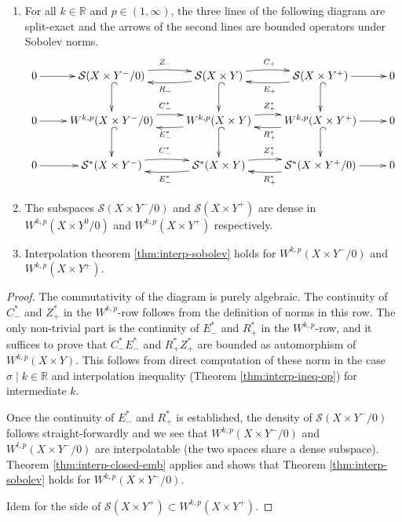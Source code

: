 \begin{theorem}
\label{thm:sobolev-def-ses}
\begin{enumerate}
\item For all \(k\in \mathbb{R}\) and \(p\in (1,\infty)\), the three lines of the following diagram are split-exact and the arrows of the second
lines are bounded operators under Sobolev norms.
\begin{equation}
\label{eq:ses-S-W-Sstar}
\xymatrix{
0 \ar@{->}[r] & \mathcal{S}(X\times Y^-/0) \ar@/^/@{->}[r]^{Z_-} \ar@{^{(}->}[d] & \mathcal{S}(X\times Y) \ar@/^/@{->}[r]^{C_+} \ar@/^/@{->}[l]^{R_-} \ar@{^{(}->}[d] & \mathcal{S}(X\times Y^+) \ar@{->}[r] \ar@/^/@{->}[l]^{E_+} \ar@{^{(}->}[d] & 0 \\
0 \ar@{->}[r] & W^{k,p}(X\times Y^-/0) \ar@{^{(}->}[d] \ar@/^/@{->}[r]^{C_-^*} & W^{k,p}(X\times Y) \ar@{^{(}->}[d] \ar@/^/@{->}[r]^{Z_+^*} \ar@/^/@{->}[l]^{E_-^*} & W^{k,p}(X\times Y^+) \ar@{->}[r] \ar@/^/@{->}[l]^{R_+^*} \ar@{^{(}->}[d] & 0 \\
0 \ar@{->}[r] & \mathcal{S}^*(X\times Y^-) \ar@/^/@{->}[r]^{C_-^*} & \mathcal{S}^*(X\times Y) \ar@/^/@{->}[r]^{Z_+^*} \ar@/^/@{->}[l]^{E_-^*} & \mathcal{S}^*(X\times Y^+/0) \ar@{->}[r] \ar@/^/@{->}[l]^{R_+^*} & 0
}
\end{equation}
\item The subspaces \(\mathcal{S}(X\times Y^-/0)\) and \(\mathcal{S}(X\times Y^+)\) are dense
in \(W^{k,p}(X\times Y^0/0)\) and \(W^{k,p}(X\times Y^+)\) respectively.
\item Interpolation theorem \ref{thm:interp-sobolev} holds for \(W^{k,p}(X\times Y^-/0)\) and
\(W^{k,p}(X\times Y^+)\).
\end{enumerate}
\end{theorem}
\begin{proof}
The commutativity of the diagram is purely algebraic. The continuity of \(C^*_-\) and \(Z^*_+\) in the \(W^{k,p}\)-row follows from the definition of norms in this row. The
only non-trivial part is the continuity of \(E^*_-\) and \(R^*_+\) in the \(W^{k,p}\)-row, and it suffices to prove that \(C^*_- E^*_-\) and \(R^*_+ Z^*_+\) are bounded
as automorphism of \(W^{k,p}(X\times Y)\). This follows from direct computation of these
norm in the case \(\sigma \mid k\in \mathbb{R}\) and interpolation inequality (Theorem
\ref{thm:interp-ineq-op}) for intermediate \(k\).

Once the continuity of \(E^*_-\) and \(R_+^*\) is established, the density of \(\mathcal{S}(X\times Y^-/0)\) follows straight-forwardly and we see that \(W^{k,p}(X\times Y^-/0)\) and \(W^{l,p}(X\times Y^-/0)\) are interpolatable (the two
spaces share a dense subspace). Theorem \ref{thm:interp-closed-emb} applies and shows that
Theorem \ref{thm:interp-sobolev} holds for \(W^{k,p}(X\times Y^-/0)\). 

Idem for the side of \(\mathcal{S}(X\times Y^+)\subset W^{k,p}(X\times Y^+)\).
\end{proof}

